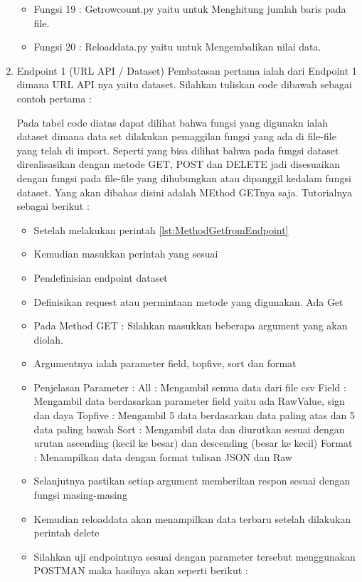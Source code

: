 \begin{enumerate}
\begin{itemize}
            
        \item Fungsi 19 : Getrowcount.py yaitu untuk Menghitung jumlah baris pada file.
            
        \item Fungsi 20 : Reloaddata.py yaitu untuk Mengembalikan nilai data.
            
      \end{itemize}

  \item Endpoint 1 (URL API / Dataset)
  Pembatasan pertama ialah dari Endpoint 1 dimana URL API nya yaitu dataset. Silahkan tuliskan code dibawah sebagai contoh pertama :
  

  Pada tabel code diatas dapat dilihat bahwa fungsi yang digunakn ialah dataset dimana data set dilakukan pemaggilan fungsi yang ada di file-file yang telah di import. Seperti yang bisa dilihat bahwa pada fungsi dataset direalisasikan dengan metode GET, POST dan DELETE jadi disesuaikan dengan fungsi pada file-file yang dihubungkan atau dipanggil kedalam fungsi dataset. Yang akan dibahas disini adalah MEthod GETnya saja. Tutorialnya sebagai berikut :
  \begin{itemize}
    \item Setelah melakukan perintah \ref{lst:MethodGetfromEndpoint}
    \item Kemudian masukkan perintah yang sesuai
    \item Pendefinisian endpoint dataset
    \item Definisikan request atau permintaan metode yang digunakan. Ada Get 
    \item Pada Method GET : Silahkan masukkan beberapa argument yang akan diolah.
    \item Argumentnya ialah parameter field, topfive, sort dan format
    \item Penjelasan Parameter :
        \subitem All : Mengambil semua data dari file csv
        \subitem Field : Mengambil data berdasarkan parameter field yaitu ada RawValue, sign dan daya
        \subitem Topfive : Mengambil 5 data berdasarkan data paling atas dan 5 data paling bawah
        \subitem Sort : Mengambil data dan diurutkan sesuai dengan urutan ascending (kecil ke besar) dan descending (besar ke kecil)
        \subitem Format : Menampilkan data dengan format tulisan JSON dan Raw
    \item Selanjutnya pastikan setiap argument memberikan respon sesuai dengan fungsi masing-masing 
    \item Kemudian reloaddata akan menampilkan data terbaru setelah dilakukan perintah delete
    \item Silahkan uji endpointnya sesuai dengan parameter tersebut menggunakan POSTMAN maka hasilnya akan seperti berikut :
        

\end{itemize}
\end{enumerate}
